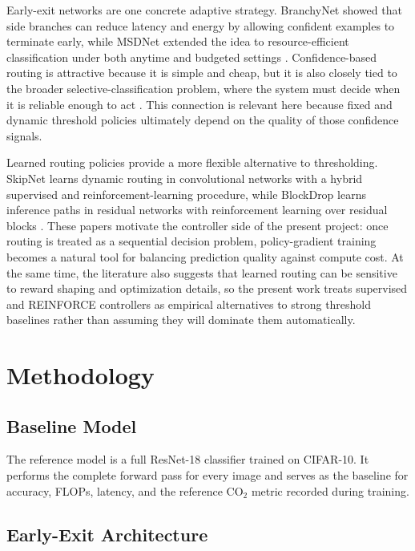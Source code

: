 \documentclass[10pt,twocolumn]{article}
\newcommand{\dataset}{CIFAR-10}
\newcommand{\backbone}{ResNet-18}
\begin{document}
Early-exit networks are one concrete adaptive strategy. BranchyNet showed that side branches can reduce latency and energy by allowing confident examples to terminate early, while MSDNet extended the idea to resource-efficient classification under both anytime and budgeted settings \cite{teerapittayanon2017branchynet,huang2017multiscale}. Confidence-based routing is attractive because it is simple and cheap, but it is also closely tied to the broader selective-classification problem, where the system must decide when it is reliable enough to act \cite{geifman2017selective}. This connection is relevant here because fixed and dynamic threshold policies ultimately depend on the quality of those confidence signals.

Learned routing policies provide a more flexible alternative to thresholding. SkipNet learns dynamic routing in convolutional networks with a hybrid supervised and reinforcement-learning procedure, while BlockDrop learns inference paths in residual networks with reinforcement learning over residual blocks \cite{wang2017skipnet,wu2017blockdrop}. These papers motivate the controller side of the present project: once routing is treated as a sequential decision problem, policy-gradient training becomes a natural tool for balancing prediction quality against compute cost. At the same time, the literature also suggests that learned routing can be sensitive to reward shaping and optimization details, so the present work treats supervised and REINFORCE controllers as empirical alternatives to strong threshold baselines rather than assuming they will dominate them automatically.

\section{Methodology}

\subsection{Baseline Model}

The reference model is a full \backbone{} classifier trained on \dataset{}. It performs the complete forward pass for every image and serves as the baseline for accuracy, FLOPs, latency, and the reference CO$_2$ metric recorded during training.

\subsection{Early-Exit Architecture}
\end{document}
